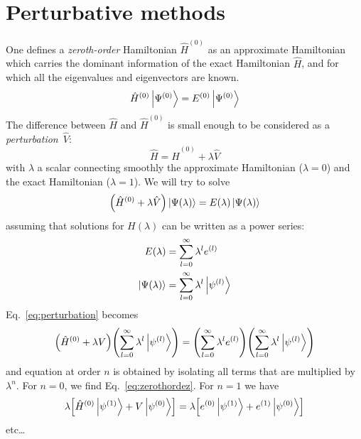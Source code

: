 \documentclass[./thesis.tex]{subfiles}
\begin{document}
\section{Perturbative methods}


One defines a \emph{zeroth-order} Hamiltonian $\hat{H}^{(0)}$ as an approximate Hamiltonian which carries the dominant information of the exact Hamiltonian $\hat{H}$, and for which all the eigenvalues and eigenvectors are known.
\begin{equation}
\label{eq:zerothordez}
\hat{H}^{(0)} \ket {\Psi^{(0)}} = E^{(0)} \ket{\Psi^{(0)}}
\end{equation}
The difference between $\hat{H}$ and
$\hat{H}^{(0)}$ is small enough to be considered as a \emph{perturbation}~$\hat{V}$:
\begin{equation}
\hat{H} = \hat{H}^{(0)} + \lambda \hat{V}
\end{equation}
with $\lambda$ a scalar connecting smoothly the approximate Hamiltonian ($\lambda=0$) and the exact Hamiltonian ($\lambda=1$). We will try to solve
\begin{equation}
\label{eq:perturbation}
\qty(\hat{H}^{(0)} + \lambda \hat{V}) \ket {\Psi (\lambda)} = E(\lambda)\ket {\Psi (\lambda)}
\end{equation}
assuming that solutions for $H(\lambda)$ can be written as a power series:
\begin{align}
E(\lambda) & = \sum_{l=0}^{\infty} \lambda^l e^{(l)}  \\
\ket {\Psi (\lambda)} & = \sum_{l=0}^{\infty} \lambda^l \ket {\psi^{(l)}} 
\end{align}
Eq.~\eqref{eq:perturbation} becomes
\begin{equation}
\qty(\hat{H}^{(0)} + \lambda V) \qty( \sum_{l=0}^{\infty} \lambda^l \ket {\psi^{(l)}} )  = \qty( \sum_{l=0}^{\infty} \lambda^l e^{(l)} ) \qty( \sum_{l=0}^{\infty} \lambda^l \ket {\psi^{(l)}} )
\end{equation}
and equation at order $n$ is obtained by isolating all terms that are multiplied by $\lambda^n$. For $n=0$, we find Eq.~\eqref{eq:zerothordez}. For $n=1$ we have
\begin{equation}
\lambda \qty[ \hat{H}^{(0)} \ket {\psi^{(1)}} + V \ket {\psi^{(0)}} ] = \lambda \qty[ e^{(0)} \ket {\psi^{(1)}} + e^{(1)} \ket {\psi^{(0)}} ]
\end{equation}
etc\dots
\end{document}
